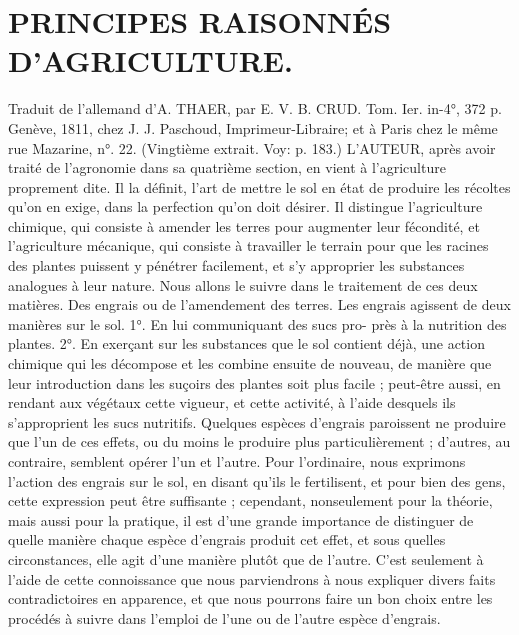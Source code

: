 \setcounter{page}{224} \section{PRINCIPES RAISONNÉS D'AGRICULTURE.}
Traduit de l'allemand d'A. THAER, par
E. V. B. CRUD. Tom. Ier. in-4°, 372 p.
Genève, 1811, chez J. J. Paschoud, Imprimeur-Libraire; et à Paris chez le même
rue Mazarine, n°. 22.
(Vingtième extrait. Voy: p. 183.)
L'AUTEUR, après avoir traité de l'agronomie dans sa quatrième section, en vient à
l'agriculture proprement dite. Il la définit,
l'art de mettre le sol en état de produire les
récoltes qu'on en exige, dans la perfection
qu'on doit désirer. Il distingue l'agriculture
chimique, qui consiste à amender les terres
pour augmenter leur fécondité, et l'agriculture mécanique, qui consiste à travailler le
terrain pour que les racines des plantes puissent y pénétrer facilement, et s'y approprier
les substances analogues à leur nature. Nous
allons le suivre dans le traitement de ces
deux matières.
Des engrais ou de l'amendement des terres.
Les engrais agissent de deux manières sur
le sol.
1°. En lui communiquant des sucs pro-\setcounter{page}{225} près à la nutrition des plantes. 2°. En exerçant sur les substances que le sol contient déjà, une action chimique qui les décompose et les combine ensuite de nouveau, de manière que leur introduction dans les suçoirs des plantes soit plus facile ; peut-être aussi, en rendant aux végétaux cette vigueur, et cette activité, à l'aide desquels ils s'approprient les sucs nutritifs.
Quelques espèces d'engrais paroissent ne produire que l'un de ces effets, ou du moins le produire plus particulièrement ; d'autres, au contraire, semblent opérer l'un et l'autre.
Pour l'ordinaire, nous exprimons l'action des engrais sur le sol, en disant qu'ils le fertilisent, et pour bien des gens, cette expression peut être suffisante ; cependant, nonseulement pour la théorie, mais aussi pour la pratique, il est d'une grande importance de distinguer de quelle manière chaque espèce d'engrais produit cet effet, et sous quelles circonstances, elle agit d'une manière plutôt que de l'autre. C'est seulement à l'aide de cette connoissance que nous parviendrons à nous expliquer divers faits contradictoires en apparence, et que nous pourrons faire un bon choix entre les procédés à suivre dans l'emploi de l'une ou de l'autre espèce d'engrais.
